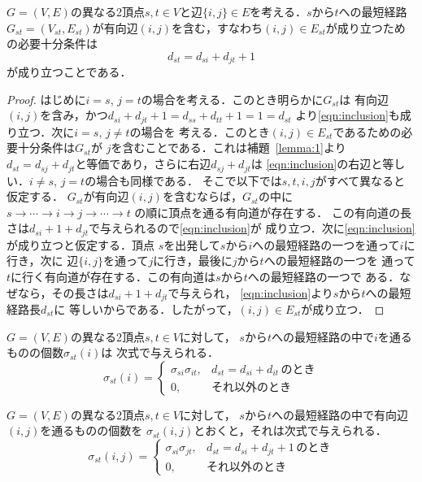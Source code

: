 \begin{lemma}
$G=(V,E)$の異なる2頂点$s,t\in V$と辺$\{i,j\} \in E$を考える．$s$から$t$への最短経路$G_{st}=(V_{st},E_{st})$が有向辺$(i,j)$を含む，すなわち$(i,j) \in E_{st}$が成り立つための必要十分条件は
\begin{equation}
d_{st}=d_{si}+d_{jt}+1
\label{eqn:inclusion}
\end{equation}
が成り立つことである．
\label{lemma:2}
\end{lemma}
\begin{proof}
はじめに$i=s$, $j=t$の場合を考える．このとき明らかに$G_{st}$は
有向辺$(i,j)$を含み，かつ$d_{si}+d_{jt}+1=d_{ss}+d_{tt}+1=1=d_{st}$
より\eqref{eqn:inclusion}も成り立つ．次に$i=s$, $j \neq t$の場合を
考える．このとき$(i,j)\in E_{st}$であるための必要十分条件は$G_{st}$が
$j$を含むことである．これは補題~\ref{lemma:1}より
$d_{st}=d_{sj}+d_{jt}$と等価であり，さらに右辺$d_{sj}+d_{jt}$は
\eqref{eqn:inclusion}の右辺と等しい．$i\neq s$, $j=t$の場合も同様である．
そこで以下では$s,t,i,j$がすべて異なると仮定する．
$G_{st}$が有向辺$(i,j)$を含むならば，$G_{st}$の中に
$s \rightarrow \cdots \rightarrow i \rightarrow j \rightarrow \cdots \rightarrow t$
の順に頂点を通る有向道が存在する．
この有向道の長さは$d_{si}+1+d_{jt}$で与えられるので\eqref{eqn:inclusion}が
成り立つ．次に\eqref{eqn:inclusion}が成り立つと仮定する．頂点
$s$を出発して$s$から$i$への最短経路の一つを通って$i$に行き，次に
辺$\{i,j\}$を通って$j$に行き，最後に$j$から$t$への最短経路の一つを
通って$t$に行く有向道が存在する．この有向道は$s$から$t$への最短経路の一つで
ある．なぜなら，その長さは$d_{si}+1+d_{jt}$で与えられ，
\eqref{eqn:inclusion}より$s$から$t$への最短経路長$d_{st}$に
等しいからである．したがって，$(i,j) \in E_{st}$が成り立つ．
\end{proof}

\begin{lemma}
$G=(V,E)$の異なる2頂点$s,t \in V$に対して，
$s$から$t$への最短経路の中で$i$を通るものの個数$\sigma_{st}(i)$は
次式で与えられる．
\begin{equation}
\sigma_{st}(i)=
\left\{
\begin{array}{ll}
\sigma_{si} \sigma_{it}, & d_{st}=d_{si}+d_{it}\,\mbox{のとき} \\
0, & \mbox{それ以外のとき}
\end{array}
\right.
\label{eqn:sigma_sti}
\end{equation}
\label{lemma:3}
\end{lemma}

\begin{lemma}
$G=(V,E)$の異なる2頂点$s,t \in V$に対して，
$s$から$t$への最短経路の中で有向辺$(i,j)$を通るものの個数を
$\sigma_{st}(i,j)$とおくと，それは次式で与えられる．
\begin{equation*}
\sigma_{st}(i,j)=
\left\{
\begin{array}{ll}
\sigma_{si} \sigma_{jt}, & d_{st}=d_{si}+d_{jt}+1\,\mbox{のとき} \\
0, & \mbox{それ以外のとき}
\end{array}
\right.
\end{equation*}
\label{lemma:4}
\end{lemma}


